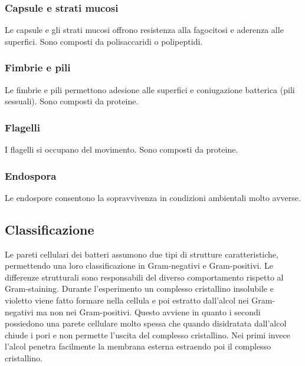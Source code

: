 \subsubsection{Capsule e strati mucosi}
Le capsule e gli strati mucosi offrono resistenza alla fagocitosi e aderenza alle superfici. Sono composti da polisaccaridi o polipeptidi. 
\subsubsection{Fimbrie e pili}
Le fimbrie e pili permettono adesione alle superfici e coniugazione batterica (pili sessuali). Sono composti da proteine.
\subsubsection{Flagelli}
I flagelli si occupano del movimento. Sono composti da proteine.
\subsubsection{Endospora}
Le endospore consentono la sopravvivenza in condizioni ambientali molto avverse. 
\subsection{Classificazione}
Le pareti cellulari dei batteri assumono due tipi di strutture caratteristiche, permettendo una loro classificazione in Gram-negativi e Gram-positivi. Le differenze strutturali sono
responsabili del diverso comportamento rispetto al Gram-staining. Durante l'esperimento un complesso cristallino insolubile e violetto viene fatto formare nella cellula e poi 
estratto dall'alcol nei Gram-negativi ma non nei Gram-positivi. Questo avviene in quanto i secondi possiedono una parete cellulare molto spessa che quando disidratata dall'alcol chiude
i pori e non permette l'uscita del complesso cristallino. Nei primi invece l'alcol penetra facilmente la membrana esterna estraendo poi il complesso cristallino. 
